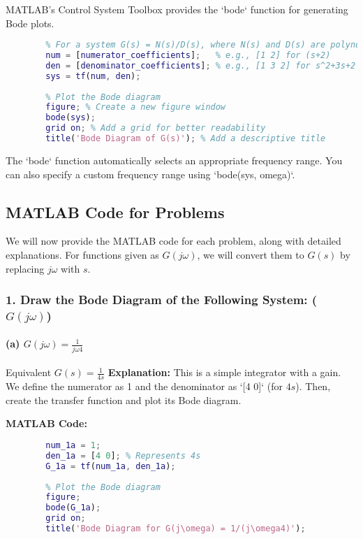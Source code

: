 \documentclass[a4paper,12pt]{article}
\begin{document}
	MATLAB's Control System Toolbox provides the `bode` function for generating Bode plots.
	
	\begin{lstlisting}[language=Matlab, caption=General MATLAB usage for Bode Plot]
		% Define the transfer function
		% For a system G(s) = N(s)/D(s), where N(s) and D(s) are polynomials in s
		num = [numerator_coefficients];   % e.g., [1 2] for (s+2)
		den = [denominator_coefficients]; % e.g., [1 3 2] for s^2+3s+2
		sys = tf(num, den);
		
		% Plot the Bode diagram
		figure; % Create a new figure window
		bode(sys);
		grid on; % Add a grid for better readability
		title('Bode Diagram of G(s)'); % Add a descriptive title
	\end{lstlisting}
	The `bode` function automatically selects an appropriate frequency range. You can also specify a custom frequency range using `bode(sys, omega)`.
	
	\subsection*{MATLAB Code for Problems}
	
	We will now provide the MATLAB code for each problem, along with detailed explanations. For functions given as $G(j\omega)$, we will convert them to $G(s)$ by replacing $j\omega$ with $s$.
	
	\subsubsection*{1. Draw the Bode Diagram of the Following System: ($G(j\omega)$)}
	
	\paragraph{(a) $G(j\omega) = \frac{1}{j\omega4}$}
	Equivalent $G(s) = \frac{1}{4s}$
	\textbf{Explanation:}
	This is a simple integrator with a gain. We define the numerator as 1 and the denominator as `[4 0]` (for $4s$). Then, create the transfer function and plot its Bode diagram.
	
	\textbf{MATLAB Code:}
	\begin{lstlisting}[language=Matlab, caption=MATLAB Code for Problem 1(a)]
		% Define the transfer function G(s) = 1/(4s)
		num_1a = 1;
		den_1a = [4 0]; % Represents 4s
		G_1a = tf(num_1a, den_1a);
		
		% Plot the Bode diagram
		figure;
		bode(G_1a);
		grid on;
		title('Bode Diagram for G(j\omega) = 1/(j\omega4)');
	\end{lstlisting}
	
\end{document}
